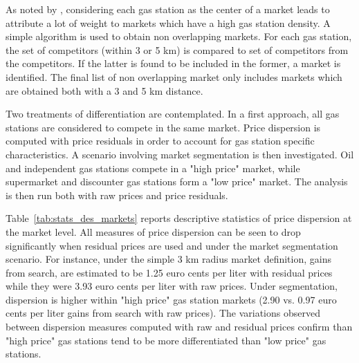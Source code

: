 \documentclass[english]{article}
\begin{document}
As noted by \cite{TAP11}, considering each gas station as the center of a market leads to attribute a lot of weight to markets which have a high gas station density. A simple algorithm is used to obtain non overlapping markets.  For each gas station, the set of competitors (within 3 or 5 km) is compared to set of competitors from the competitors. If the latter is found to be included in the former, a market is identified. The final list of non overlapping market only includes markets which are obtained both with a 3 and 5 km distance.

Two treatments of differentiation are contemplated. In a first approach, all gas stations are considered to compete in the same market. Price dispersion is computed with price residuals in order to account for gas station specific characteristics. A scenario involving market segmentation is then investigated. Oil and independent gas stations compete in a "high price" market, while supermarket and discounter gas stations form a "low price" market. The analysis is then run both with raw prices and price residuals.

Table~\ref{tab:stats_des_markets} reports descriptive statistics of price dispersion at the market level. All measures of price dispersion can be seen to drop significantly when residual prices are used and under the market segmentation scenario. For instance, under the simple 3 km radius market definition, gains from search, are estimated to be 1.25 euro cents per liter with residual prices while they were 3.93 euro cents per liter with raw prices. Under segmentation, dispersion is higher within "high price" gas station markets (2.90 vs. 0.97 euro cents per liter gains from search with raw prices). The variations observed between dispersion measures computed with raw and residual prices confirm than "high price" gas stations tend to be more differentiated than "low price" gas stations.
\end{document}
